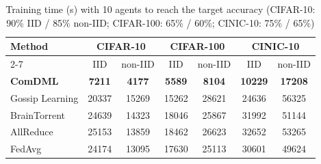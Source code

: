\documentclass[12pt,a4paper,final]{extreport}
\begin{document}
{\renewcommand{\arraystretch}{1.12}
\begin{table}[htbp]
\centering
\caption[Training time (s) with 10 agents to reach the target accuracy \cite{p4}]{Training time (s) with 10 agents to reach the target accuracy (CIFAR-10: 90\% IID / 85\% non-IID; CIFAR-100: 65\% / 60\%; CINIC-10: 75\% / 65\%) \cite{p4}}\label{tab:p4_time}
\small
\begin{tabular}{|l|c|c|c|c|c|c|}
\hline
\multirow{2}{*}{\textbf{Method}} & \multicolumn{2}{c|}{\textbf{CIFAR-10}} & \multicolumn{2}{c|}{\textbf{CIFAR-100}} & \multicolumn{2}{c|}{\textbf{CINIC-10}} \\ \cline{2-7}
 & IID & non-IID & IID & non-IID & IID & non-IID \\ \hline
\textbf{ComDML} & \textbf{7211} & \textbf{4177} & \textbf{5589} & \textbf{8104} & \textbf{10229} & \textbf{17208} \\ \hline
Gossip Learning & 20337 & 15269 & 15262 & 28621 & 24636 & 56325 \\ \hline
BrainTorrent & 24639 & 14323 & 18046 & 25867 & 31992 & 51144 \\ \hline
AllReduce & 25153 & 13859 & 18462 & 26623 & 32652 & 53265 \\ \hline
FedAvg & 24174 & 13095 & 17630 & 25113 & 30601 & 49624 \\ \hline
\end{tabular}
\end{table}}
\end{document}
